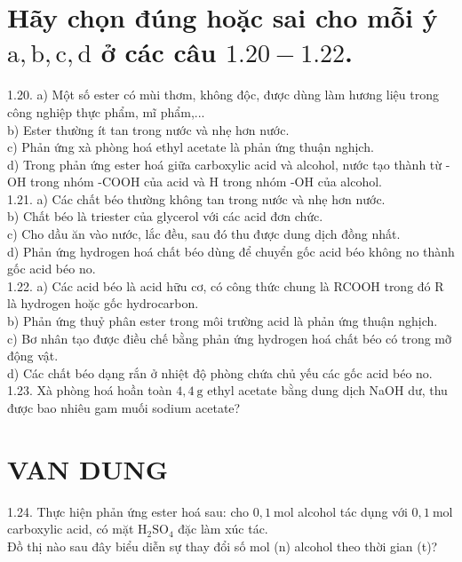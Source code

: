 \documentclass[10pt]{article}
\begin{document}
\section*{Hãy chọn đúng hoặc sai cho mỗi ý $\mathrm{a}, \mathrm{b}, \mathrm{c}, \mathrm{d}$ ở các câu $1.20-1.22$.}
1.20. a) Một số ester có mùi thơm, không độc, được dùng làm hương liệu trong công nghiệp thực phẩm, mĩ phẩm,...\\
b) Ester thường ít tan trong nước và nhẹ hơn nước.\\
c) Phản ứng xà phòng hoá ethyl acetate là phản ứng thuận nghịch.\\
d) Trong phản ứng ester hoá giữa carboxylic acid và alcohol, nước tạo thành từ -OH trong nhóm -COOH của acid và H trong nhóm -OH của alcohol.\\
1.21. a) Các chất béo thường không tan trong nước và nhẹ hơn nước.\\
b) Chất béo là triester của glycerol với các acid đơn chức.\\
c) Cho dầu ăn vào nước, lắc đều, sau đó thu được dung dịch đồng nhất.\\
d) Phản ứng hydrogen hoá chất béo dùng để chuyển gốc acid béo không no thành gốc acid béo no.\\
1.22. a) Các acid béo là acid hữu cơ, có công thức chung là RCOOH trong đó R là hydrogen hoặc gốc hydrocarbon.\\
b) Phản ứng thuỷ phân ester trong môi trường acid là phản ứng thuận nghịch.\\
c) Bơ nhân tạo được điều chế bằng phản ứng hydrogen hoá chất béo có trong mỡ động vật.\\
d) Các chất béo dạng rắn ở nhiệt độ phòng chứa chủ yếu các gốc acid béo no.\\
1.23. Xà phòng hoá hoần toàn $4,4 \mathrm{~g}$ ethyl acetate bằng dung dịch NaOH dư, thu được bao nhiêu gam muối sodium acetate?

\section*{VAN DUNG}
1.24. Thực hiện phản ứng ester hoá sau: cho $0,1 \mathrm{~mol}$ alcohol tác dụng với $0,1 \mathrm{~mol}$ carboxylic acid, có mặt $\mathrm{H}_{2} \mathrm{SO}_{4}$ đặc làm xúc tác.\\
Đồ thị nào sau đây biểu diễn sự thay đổi số mol (n) alcohol theo thời gian (t)?
\end{document}
